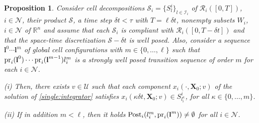 \documentclass[reqno]{amsart}
\theoremstyle{plain}
\newtheorem{prop}[thm]{Proposition}
\theoremstyle{definition}
\numberwithin{equation}{section}
\begin{document}
\begin{prop} \label{proposition:implementation:of:strwellposed}
Consider cell decompositions ${\ensuremath{\mathcal{S}}}_i=\{S_l^i\}_{l\in{\ensuremath{\mathcal{I}}}_i}$ of ${\ensuremath{\mathcal{R}}}_i([0,T])$, $i\in{\ensuremath{\mathcal{N}}}$, their product ${\ensuremath{\mathcal{S}}}$, a time step $\delta t<\tau$ with $T=\ell\delta t$, nonempty subsets $W_i$, $i\in{\ensuremath{\mathcal{N}}}$ of ${\ensuremath{\mathbb{R}^{{n}}}}$ and assume that each ${\ensuremath{\mathcal{S}}}_i$ is compliant with  ${\ensuremath{\mathcal{R}}}_i([0,T-\delta t])$ and that the space-time discretization ${\ensuremath{\mathcal{S}}}-\delta t$ is well posed. Also, consider a sequence ${\textbf{{l}}}^0\cdots{\textbf{{l}}}^m$ of global cell configurations with $m\in\{0,\ldots,\ell\}$ such that ${\rm pr}_i({\textbf{{l}}}^0)\cdots{\rm pr}_i({\textbf{{l}}}^{m-1})l^m_i$ is a strongly well posed transition sequence of order $m$ for each $i\in{\ensuremath{\mathcal{N}}}$.

\noindent \textit{(i)} Then, there exists $v\in{\ensuremath{\mathcal{U}}}$ such that each component $x_i(\cdot,{\textbf{{X}}}_0;v)$ of the solution of \eqref{single:integrator} satisfies $x_i(\kappa\delta t,{\textbf{{X}}}_0;v)\in S^i_{l_i^{\kappa}}$, for all $\kappa\in\{0,\ldots,m\}$. 

\noindent \textit{(ii)} If in addition $m<\ell$, then it holds ${\rm Post}_i(l_i^m,{\rm pr}_i({\textbf{{l}}}^m))\ne\emptyset$ for all $i\in{\ensuremath{\mathcal{N}}}$.
\end{prop}   
\end{document}

